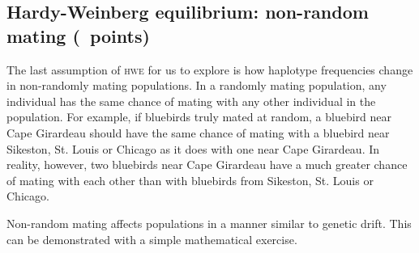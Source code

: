 \documentclass[11pt, addpoints]{exam}
\begin{document}
\subsection*{Hardy-Weinberg equilibrium: non-random mating (\numpoints\ points)}

The last assumption of \textsc{hwe} for us to explore is how haplotype
frequencies change in non-randomly mating populations. In a randomly
mating population, any individual has the same chance of mating with any
other individual in the population. For example, if bluebirds truly
mated at random, a bluebird near Cape Girardeau should have the same
chance of mating with a bluebird near Sikeston, St. Louis or Chicago as
it does with one near Cape Girardeau. In reality, however, two bluebirds
near Cape Girardeau have a much greater chance of mating with each other
than with bluebirds from Sikeston, St. Louis or Chicago.

Non-random mating affects populations in a manner similar to genetic
drift. This can be demonstrated with a simple mathematical exercise.
\end{document}

